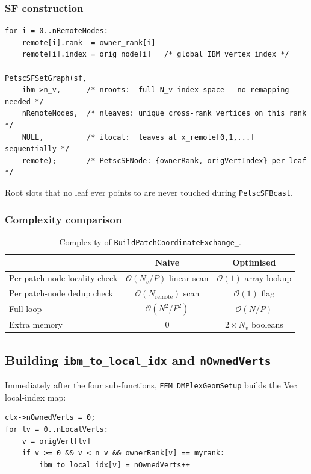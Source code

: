 \documentclass[11pt]{article}
\begin{document}
\subsubsection{SF construction}

\begin{lstlisting}
for i = 0..nRemoteNodes:
    remote[i].rank  = owner_rank[i]
    remote[i].index = orig_node[i]   /* global IBM vertex index */

PetscSFSetGraph(sf,
    ibm->n_v,      /* nroots:  full N_v index space — no remapping needed */
    nRemoteNodes,  /* nleaves: unique cross-rank vertices on this rank */
    NULL,          /* ilocal:  leaves at x_remote[0,1,...] sequentially */
    remote);       /* PetscSFNode: {ownerRank, origVertIndex} per leaf */
\end{lstlisting}

Root slots that no leaf ever points to are never touched during \texttt{PetscSFBcast}.

\subsubsection{Complexity comparison}

\begin{table}[h]
\centering
\begin{tabular}{lcc}
\toprule
& Naive & Optimised \\
\midrule
Per patch-node locality check & $\mathcal{O}(N_v/P)$ linear scan & $\mathcal{O}(1)$ array lookup \\
Per patch-node dedup check    & $\mathcal{O}(N_\text{remote})$ scan & $\mathcal{O}(1)$ flag \\
Full loop & $\mathcal{O}(N^2/P^2)$ & $\mathcal{O}(N/P)$ \\
Extra memory & 0 & $2 \times N_v$ booleans \\
\bottomrule
\end{tabular}
\caption{Complexity of \texttt{BuildPatchCoordinateExchange\_}.}
\label{tab:complexity}
\end{table}

\subsection{Building \texttt{ibm\_to\_local\_idx} and \texttt{nOwnedVerts}}

Immediately after the four sub-functions, \texttt{FEM\_DMPlexGeomSetup} builds
the Vec local-index map:

\begin{lstlisting}
ctx->nOwnedVerts = 0;
for lv = 0..nLocalVerts:
    v = origVert[lv]
    if v >= 0 && v < n_v && ownerRank[v] == myrank:
        ibm_to_local_idx[v] = nOwnedVerts++
\end{lstlisting}
\end{document}
